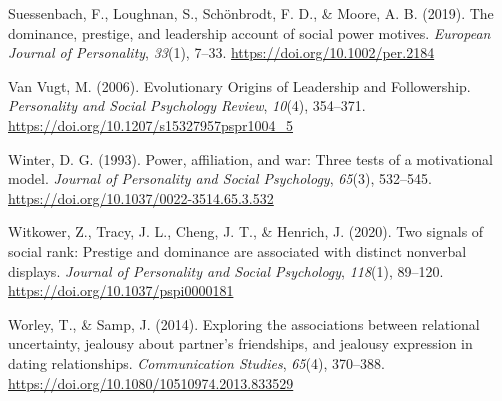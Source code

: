 \documentclass[
  english,
  a4paper]{apa7}
\newlength{\cslhangindent}
\newlength{\cslentryspacingunit} %
\newenvironment{CSLReferences}[2] %
 {%
  \setlength{\parindent}{0pt}
  \ifodd #1
  \let\oldpar\par
  \def\par{\hangindent=\cslhangindent\oldpar}
  \fi
  \setlength{\parskip}{#2\cslentryspacingunit}
 }%
 {}
\begin{document}
\begin{CSLReferences}{1}{0}
\leavevmode{}%
Suessenbach, F., Loughnan, S., Schönbrodt, F. D., \& Moore, A. B. (2019). The dominance, prestige, and leadership account of social power motives. \emph{European Journal of Personality}, \emph{33}(1), 7--33. \url{https://doi.org/10.1002/per.2184}

\leavevmode{}%
Van Vugt, M. (2006). Evolutionary {Origins} of {Leadership} and {Followership}. \emph{Personality and Social Psychology Review}, \emph{10}(4), 354--371. \url{https://doi.org/10.1207/s15327957pspr1004_5}

\leavevmode{}%
Winter, D. G. (1993). Power, affiliation, and war: {Three} tests of a motivational model. \emph{Journal of Personality and Social Psychology}, \emph{65}(3), 532--545. \url{https://doi.org/10.1037/0022-3514.65.3.532}

\leavevmode{}%
Witkower, Z., Tracy, J. L., Cheng, J. T., \& Henrich, J. (2020). Two signals of social rank: {Prestige} and dominance are associated with distinct nonverbal displays. \emph{Journal of Personality and Social Psychology}, \emph{118}(1), 89--120. \url{https://doi.org/10.1037/pspi0000181}

\leavevmode{}%
Worley, T., \& Samp, J. (2014). Exploring the associations between relational uncertainty, jealousy about partner's friendships, and jealousy expression in dating relationships. \emph{Communication Studies}, \emph{65}(4), 370--388. \url{https://doi.org/10.1080/10510974.2013.833529}

\end{CSLReferences}

\endgroup
\end{document}
